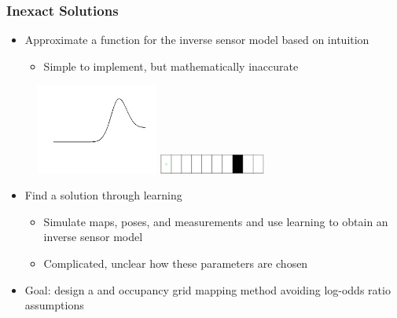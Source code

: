 \documentclass[11pt,professionalfonts,hyperref={pdftex,pdfpagemode=none,pdfstartview=FitH}]{beamer}
\renewcommand{\emph}[1]{\textit{\textbf{\color{blue}{#1}}}}
\begin{document}
\begin{frame}
\frametitle{Inexact Solutions}

\begin{minipage}[t]{7.0cm}
\begin{itemize}
	\item Approximate a function for the inverse sensor model based on intuition
	\begin{itemize}
		\item Simple to implement, but mathematically inaccurate
	\end{itemize}
\end{itemize}
\end{minipage}
\begin{minipage}[t]{3.0cm}
\begin{figure}[!htbp]
\centerline{
    \vspace*{-0.5cm}
    \includegraphics[width=4.0cm]{Approx_ISM_shortened.png}\hspace*{0.1cm}
    }
\centerline{
    \includegraphics[width=3.5cm]{1D_True_Grid.png}
    }
		\end{figure}
\end{minipage}
\vspace*{-0.5cm}
\vspace*{0.0cm}\pause
\begin{itemize}
	\item Find a solution through learning
	\begin{itemize}
		\item Simulate maps, poses, and measurements and use learning to obtain an inverse sensor model
		\item Complicated, unclear how these parameters are chosen
	\end{itemize}
	\vspace*{0.0cm}\pause
	\item Goal: design a \emph{simple} and \emph{accurate} occupancy grid mapping method avoiding log-odds ratio assumptions

\end{itemize}
\end{frame}
\end{document}
